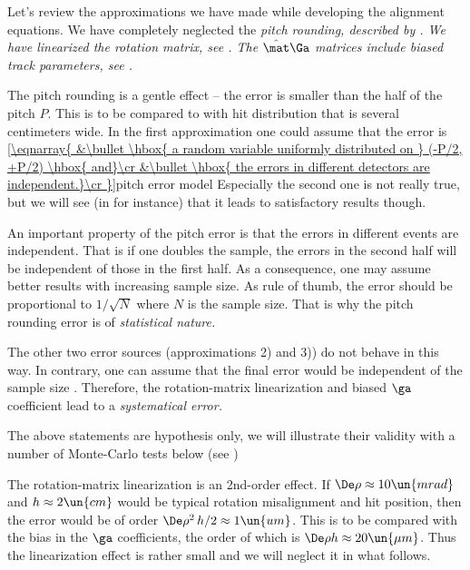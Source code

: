 Let's review the approximations we have made while developing the alignment equations.
\bitm
\itm We have completely neglected the \em{pitch rounding}, described by .
\itm We have \em{linearized the rotation matrix}, see .
\itm The $\hat\mat\Ga$ matrices include \em{biased track parameters}, see .
\eitm

The pitch rounding is a gentle effect -- the error is smaller than the half of the pitch $P$. This is to be compared to with hit distribution that is several centimeters wide. In the first approximation one could assume that the error is
\eqref{\eqnarray{
&\bullet \hbox{ a random variable uniformly distributed on } (-P/2, +P/2) \hbox{ and}\cr
&\bullet \hbox{ the errors in different detectors are independent.}\cr
}}{pitch error model}
Especially the second one is not really true, but we will see (in  for instance) that it leads to satisfactory results though.

An important property of the pitch error is that the errors in different events are independent. That is
if one doubles the sample, the errors in the second half will be independent of those in the first half. As a consequence, one may assume better results with increasing sample size. As rule of thumb, the error should be proportional to $1/\sqrt N$ where $N$ is the sample size. That is why the pitch rounding error is of \em{statistical} nature.

The other two error sources (approximations 2) and 3)) do not behave in this way. In contrary, one can assume that the final error would be independent of the sample size
. Therefore, the rotation-matrix linearization and biased $\ga$ coefficient lead to a \em{systematical} error.

The above statements are hypothesis only, we will illustrate their validity with a number of Monte-Carlo tests below (see )

The rotation-matrix linearization is an 2nd-order effect. If $\De\rho\approx 10\un{mrad}$ and $h\approx 2\un{cm}$ would be typical rotation misalignment and hit position, then the error would be of order $\De\rho^2\,h/2\approx 1\un{um}$. This is to be compared with the bias in the $\ga$ coefficients, the order of which is $\De\rho h \approx 20\un{\mu m}$. Thus the linearization effect is rather small and we will neglect it in what follows.


